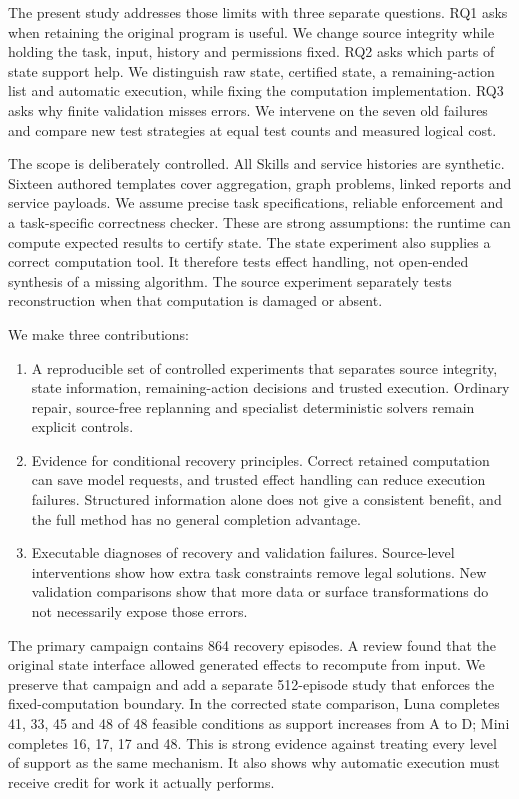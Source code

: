 \documentclass[conference]{IEEEtran}
\begin{document}
The present study addresses those limits with three separate questions. RQ1 asks when retaining the original program is useful. We change source integrity while holding the task, input, history and permissions fixed. RQ2 asks which parts of state support help. We distinguish raw state, certified state, a remaining-action list and automatic execution, while fixing the computation implementation. RQ3 asks why finite validation misses errors. We intervene on the seven old failures and compare new test strategies at equal test counts and measured logical cost.

The scope is deliberately controlled. All Skills and service histories are synthetic. Sixteen authored templates cover aggregation, graph problems, linked reports and service payloads. We assume precise task specifications, reliable enforcement and a task-specific correctness checker. These are strong assumptions: the runtime can compute expected results to certify state. The state experiment also supplies a correct computation tool. It therefore tests effect handling, not open-ended synthesis of a missing algorithm. The source experiment separately tests reconstruction when that computation is damaged or absent.

We make three contributions:
\begin{enumerate}
\item A reproducible set of controlled experiments that separates source integrity, state information, remaining-action decisions and trusted execution. Ordinary repair, source-free replanning and specialist deterministic solvers remain explicit controls.
\item Evidence for conditional recovery principles. Correct retained computation can save model requests, and trusted effect handling can reduce execution failures. Structured information alone does not give a consistent benefit, and the full method has no general completion advantage.
\item Executable diagnoses of recovery and validation failures. Source-level interventions show how extra task constraints remove legal solutions. New validation comparisons show that more data or surface transformations do not necessarily expose those errors.
\end{enumerate}

The primary campaign contains 864 recovery episodes. A review found that the original state interface allowed generated effects to recompute from input. We preserve that campaign and add a separate 512-episode study that enforces the fixed-computation boundary. In the corrected state comparison, Luna completes 41, 33, 45 and 48 of 48 feasible conditions as support increases from A to D; Mini completes 16, 17, 17 and 48. This is strong evidence against treating every level of support as the same mechanism. It also shows why automatic execution must receive credit for work it actually performs.
\end{document}
